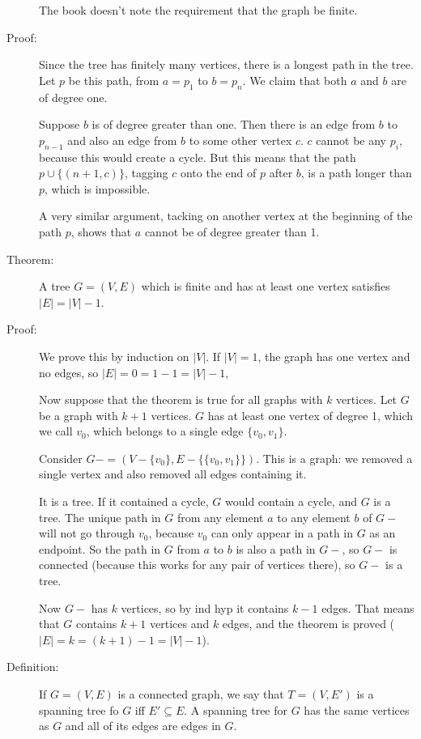 \documentclass[12pt]{article}
\begin{document}
\begin{description}
The book doesn't note the requirement that the graph be finite.

\item[Proof:]  Since the tree has finitely many vertices, there is a longest path in the tree.  Let $p$ be this 
path, from $a=p_1$ to $b=p_n$.  We claim that both $a$ and $b$ are of degree one.

Suppose $b$ is of degree greater than one.  Then there is an edge from $b$ to $p_{n-1}$ and also an edge from
$b$ to some other vertex $c$.  $c$ cannot be any $p_i$, because this would create a cycle.  But this means that
the path $p \cup \{(n+1,c)\}$, tagging $c$ onto the end of $p$ after $b$, is a path longer than $p$, which is impossible.

A very similar argument, tacking on another vertex at the beginning of the path $p$, shows that $a$ cannot be of degree greater than 1.

\item[Theorem:]  A tree $G = (V,E)$ which is finite and has at least one vertex satisfies $|E| = |V|-1$.

\item[Proof:]  We prove this by induction on $|V|$.  If $|V|=1$, the graph has one vertex and no edges, so $|E| = 0 = 1-1 = |V|-1$,

Now suppose that the theorem is true for all graphs with $k$ vertices.  Let $G$ be a graph with $k+1$ vertices.
$G$ has at least one vertex of degree 1, which we call $v_0$, which belongs to a single edge $\{v_0,v_1\}$.

Consider $G- = (V - \{v_0\},E - \{\{v_0,v_1\}\})$.  This is a graph:  we removed a single vertex and also removed all edges containing it.

It is a tree.  If it contained a cycle, $G$ would contain a cycle, and $G$ is a tree.  The unique path in $G$ from any element $a$ to any element $b$ of $G-$ will not go through $v_0$, because $v_0$ can only appear in a path in $G$ as an endpoint.  So the path in $G$ from $a$ to $b$ is also a path in $G-$, so $G-$ is connected (because this works for any pair of vertices there), so $G-$ is a tree.

Now $G-$ has $k$ vertices, so by ind hyp it contains $k-1$ edges.  That means that $G$ contains $k+1$ vertices and $k$ edges, and the theorem is proved ($|E| = k = (k+1)-1 = |V|-1$).

\item[Definition:]  If $G=(V,E)$ is a connected graph, we say that $T = (V,E')$ is a spanning tree fo $G$ iff
$E' \subseteq E$.  A spanning tree for $G$ has the same vertices as $G$ and all of its edges are edges in $G$.


\end{description}
\end{document}
